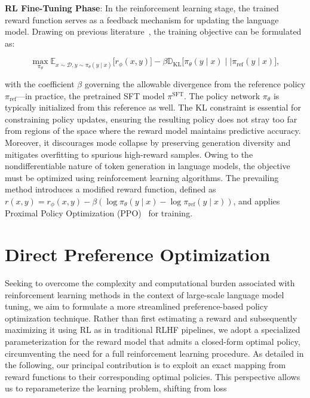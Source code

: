 \textbf{RL Fine-Tuning Phase}: In the reinforcement learning stage, the trained reward function serves as a feedback mechanism for updating the language model. Drawing on previous literature~\citep{jaques2017sequence, jaques2020human}, the training objective can be formulated as:

\begin{equation}\label{eq:RL}
\max_{\pi_{\theta}}  \mathbb{E}_{x\sim \mathcal{D}, y\sim \pi_{\theta}(y \mid x)}\bigl[r_{\phi}(x, y)\bigr] - \beta\mathbb{D}_{\textrm{KL}}\bigl[\pi_{\theta}(y\mid x)\mid \mid \pi_\text{ref}(y\mid x)\bigr],
\end{equation}

with the coefficient $\beta$ governing the allowable divergence from the reference policy $\pi_\text{ref}$—in practice, the pretrained SFT model $\pi^\text{SFT}$. The policy network $\pi_\theta$ is typically initialized from this reference as well. The KL constraint is essential for constraining policy updates, ensuring the resulting policy does not stray too far from regions of the space where the reward model maintains predictive accuracy. Moreover, it discourages mode collapse by preserving generation diversity and mitigates overfitting to spurious high-reward samples. Owing to the nondifferentiable nature of token generation in language models, the objective must be optimized using reinforcement learning algorithms. The prevailing method \citep{ziegler2020finetuning, stiennon2022learning, bai2022training, ouyang2022training} introduces a modified reward function, defined as ${r(x, y) = r_{\phi}(x, y) -\beta (\log \pi_{\theta}(y\mid x) - \log \pi_\text{ref}(y\mid x))}$, and applies Proximal Policy Optimization (PPO)~\cite{schulman2017proximal} for training.

\section{Direct Preference Optimization}\label{sec:DPO}

Seeking to overcome the complexity and computational burden associated with reinforcement learning methods in the context of large-scale language model tuning, we aim to formulate a more streamlined preference-based policy optimization technique. Rather than first estimating a reward and subsequently maximizing it using RL as in traditional RLHF pipelines, we adopt a specialized parameterization for the reward model that admits a closed-form optimal policy, circumventing the need for a full reinforcement learning procedure. As detailed in the following, our principal contribution is to exploit an exact mapping from reward functions to their corresponding optimal policies. This perspective allows us to reparameterize the learning problem, shifting from loss


